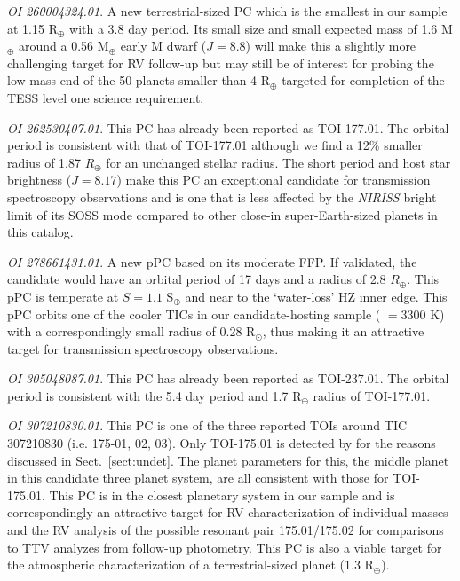 \emph{OI 260004324.01}. A new terrestrial-sized PC which is the smallest in our sample
at 1.15 R$_{\oplus}$ with a 3.8 day period. Its small size and small expected mass of 1.6 M$_{\oplus}$
around a 0.56 M$_{\oplus}$ early M dwarf ($J=8.8$) will make this a slightly more challenging target
for RV follow-up but may still be of interest for probing the low mass end of the 50 planets
smaller than 4 R$_{\oplus}$ targeted for completion of the TESS level one science requirement.

\emph{OI 262530407.01}. This PC has already been reported as TOI-177.01. The \pipeline{} orbital
period is consistent with that of TOI-177.01 although we find a 12\% smaller radius of 1.87
$R_{\oplus}$ for an unchanged stellar radius. The short period and host star brightness ($J=8.17$)
make this PC an exceptional candidate for transmission spectroscopy observations and is one
that is less affected by the \emph{NIRISS} bright limit of its SOSS mode compared to other
close-in super-Earth-sized planets in this catalog.

\emph{OI 278661431.01}. A new pPC based on its moderate FFP. If validated, the candidate
would have an orbital period of 17 days and a radius of 2.8 $R_{\oplus}$. This pPC is temperate
at $S=1.1$ S$_{\oplus}$ and near to the `water-loss' HZ inner edge. This pPC orbits one of the
cooler TICs in our candidate-hosting sample (\teff{} $=3300$ K) with a correspondingly small
radius of 0.28 R$_{\odot}$, thus making it an attractive target for transmission spectroscopy
observations.

\emph{OI 305048087.01}. This PC has already been reported as TOI-237.01. The \pipeline{} orbital
period is consistent with the 5.4 day period and 1.7 R$_{\oplus}$ radius of TOI-177.01.

\emph{OI 307210830.01}. This PC is one of the three reported TOIs around TIC 307210830 (i.e. 175-01,
02, 03). Only TOI-175.01 is detected by \pipeline{} for the reasons discussed in Sect.~\ref{sect:undet}.
The \pipeline{} planet parameters for this, the middle planet in this candidate three planet
system, are all consistent with those for TOI-175.01. This PC is in the closest planetary system
in our sample and is correspondingly an attractive target for RV characterization of individual masses
and the RV analysis of the  possible resonant pair 175.01/175.02 for comparisons to TTV analyzes
from follow-up photometry. This PC is also a viable target for the atmospheric characterization of
a terrestrial-sized planet (1.3 R$_{\oplus}$).

